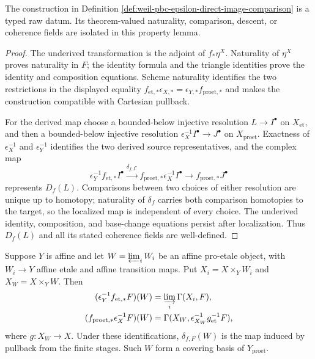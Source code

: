 \begin{lemma}
\label{lemma:weil-sf-well-defined-def-weil-pbc-epsilon-direct-image-comparison}
The construction in Definition \ref{def:weil-pbc-epsilon-direct-image-comparison} is a typed raw datum.  Its theorem-valued naturality, comparison, descent, or coherence fields are isolated in this property lemma.
\end{lemma}
\begin{proof}
The underived transformation is the adjoint of $f_*\eta^X$.  Naturality of
$\eta^X$ proves naturality in $F$; the identity formula and the triangle
identities prove the identity and composition equations.  Scheme naturality
identifies the two restrictions in the displayed equality
$f_{\mathrm{et},*}\epsilon_{X,*}=\epsilon_{Y,*}f_{\mathrm{proet},*}$ and
makes the construction compatible with Cartesian pullback.

For the derived map choose a bounded-below injective resolution
$L\to I^\bullet$ on $X_{\mathrm{et}}$, and then a bounded-below injective
resolution $\epsilon_X^{-1}I^\bullet\to J^\bullet$ on
$X_{\mathrm{proet}}$.  Exactness of $\epsilon_X^{-1}$ and
$\epsilon_Y^{-1}$ identifies the two derived source representatives, and the
complex map
\[
 \epsilon_Y^{-1}f_{\mathrm{et},*}I^\bullet
 \xrightarrow{\delta_{f,I^\bullet}}
 f_{\mathrm{proet},*}\epsilon_X^{-1}I^\bullet
 \longrightarrow f_{\mathrm{proet},*}J^\bullet
\]
represents $D_f(L)$.  Comparisons between two choices of either resolution
are unique up to homotopy; naturality of $\delta_f$ carries both comparison
homotopies to the target, so the localized map is independent of every
choice.  The underived
identity, composition, and base-change equations persist after localization.
Thus $D_f(L)$ and all its stated coherence fields are well-defined.
\end{proof}
\begin{lemma}
\label{lemma:weil-pbc-epsilon-direct-image-site-comparison}
Suppose $Y$ is affine and let
$W=\varprojlim_iW_i$ be an affine pro-etale object, with $W_i\to Y$ affine
etale and affine transition maps.  Put
$X_i=X\times_YW_i$ and $X_W=X\times_YW$.  Then
\begin{align*}
 (\epsilon_Y^{-1}f_{\mathrm{et},*}F)(W)
   &=\varinjlim_i\Gamma(X_i,F),\\
 (f_{\mathrm{proet},*}\epsilon_X^{-1}F)(W)
   &=\Gamma(X_W,\epsilon_{X_W}^{-1}g_{\mathrm{et}}^{-1}F),
\end{align*}
where $g:X_W\to X$.  Under these identifications, $\delta_{f,F}(W)$ is the
map induced by pullback from the finite stages.  Such $W$ form a covering
basis of $Y_{\mathrm{proet}}$.
\end{lemma}
